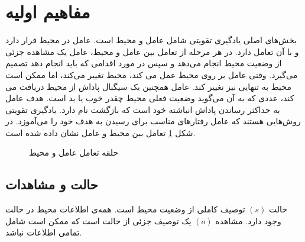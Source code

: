 \section{مفاهیم اولیه}
بخش‌های اصلی یادگیری تقویتی
شامل عامل
 و محیط
  است. عامل در محیط قرار دارد و با آن تعامل دارد.
  در هر مرحله از تعامل بین عامل و محیط، عامل یک مشاهده جزئی از وضعیت محیط انجام می‌دهد و سپس در مورد اقدامی که باید انجام دهد تصمیم می‌گیرد. وقتی عامل بر روی محیط عمل می کند، محیط تغییر می‌کند، اما ممکن است محیط به تنهایی نیز تغییر کند.
  عامل همچنین یک سیگنال پاداش
   از محیط دریافت می کند، عددی که به آن می‌گوید وضعیت فعلی محیط چقدر خوب یا بد است. هدف عامل به حداکثر رساندن پاداش انباشته خود است که بازگشت
    نام دارد. یادگیری تقویتی روش‌هایی هستند که عامل رفتارهای مناسب برای رسیدن به هدف خود را می‌آموزد. در شکل
    \ref{fig:agent_env}
    تعامل بین محیط و عامل نشان داده شده است.
\begin{figure}[H]
	\begin{center}
	\end{center}
	\caption{حلقه تعامل عامل و محیط}
	\label{fig:agent_env}
\end{figure}
\subsection{حالت و مشاهدات}
حالت
\((s)\)
 توصیف کاملی از وضعیت محیط است. همه‌ی اطلاعات محیط در حالت وجود دارد. مشاهده
 \((o)\)
  یک توصیف جزئی از حالت است که ممکن است شامل تمامی اطلاعات نباشد.

